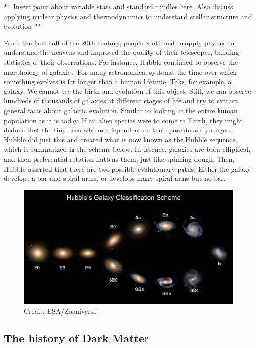 ** Insert point about variable stars and standard candles here. Also discuss applying nuclear physics and thermodynamics to understand stellar structure and evolution ** 

From the first half of the 20th century, people continued to apply physics to understand the heavens and improved the quality of their telescopes, building statistics of their observations. For instance, Hubble continued to observe the morphology of galaxies. For many astronomical systems, the time over which something evolves is far longer than a human lifetime. Take, for example, a galaxy. We cannot see the birth and evolution of this object. Still, we can observe hundreds of thousands of galaxies at different stages of life and try to extract general facts about galactic evolution. Similar to looking at the entire human population as it is today. If an alien species were to come to Earth, they might deduce that the tiny ones who are dependent on their parents are younger. Hubble did just this and created what is now known as the Hubble sequence, which is summarized in the schema below. In essence, galaxies are born elliptical, and then preferential rotation flattens them, just like spinning dough. Then, Hubble asserted that there are two possible evolutionary paths. Either the galaxy develops a bar and spiral arms, or develops many spiral arms but no bar. 


\begin{figure}
    \centering
    \includegraphics[width=\linewidth]{images/hubble-sequence.jpg}
    \caption{Credit: ESA/Zooniverse}
    \label{fig:images/Hubble_Tuning_Fork_diagram}
\end{figure}


\subsection{The history of Dark Matter}

